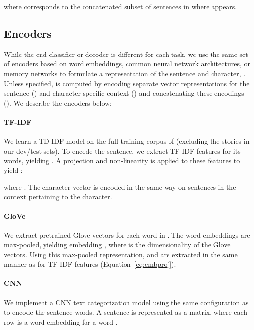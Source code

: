 \documentclass[11pt,a4paper]{article}
\begin{document}
\noindent where  corresponds to the concatenated subset of sentences in  where  appears.

\subsection{Encoders}
\label{ssec:model} 

While the end classifier or decoder is different for each task, we use the same set of encoders based on word embeddings, common neural network architectures, or memory networks to formulate a representation of the sentence and character, . Unless specified,  is computed by encoding separate vector representations for the sentence () and character-specific context () and concatenating these encodings (). We describe the encoders below:

\paragraph{TF-IDF} We learn a TD-IDF model on the full training corpus of \citet{Mostafazadeh2016-ei} (excluding the stories in our dev/test sets).
To encode the sentence, we extract TF-IDF features for its words, yielding . A projection and non-linearity is applied to these features to yield :
\vspace*{-1mm}


\noindent where . The character vector  is encoded in the same way on sentences in the context pertaining to the character. 

\paragraph{GloVe} We extract pretrained Glove vectors \cite{pennington2014glove} for each word in . The word embeddings are max-pooled, yielding embedding , where  is the dimensionality of the Glove vectors. Using this max-pooled representation,  and  are extracted in the same manner as for TF-IDF features (Equation~\ref{eq:embproj}).

\paragraph{CNN} We implement a CNN text categorization model using the same configuration as \citet{Kim2014ConvolutionalNN} to encode the sentence words. A sentence is represented as a matrix,  where each row is a word embedding  for a word .
\vspace{-1mm}
\end{document}
